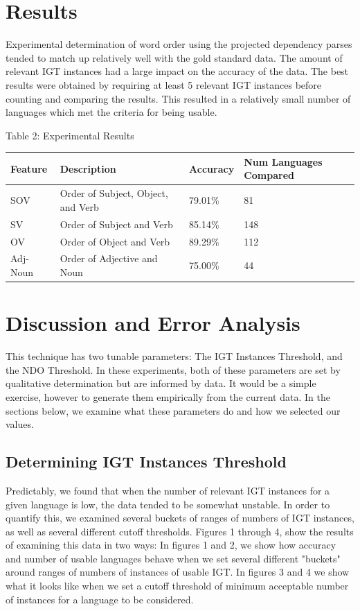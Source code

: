 \documentclass[]{article}
\begin{document}
\section{Results}
Experimental determination of word order using the projected dependency parses tended to match up relatively well with the gold standard data.  The amount of relevant IGT instances had a large impact on the accuracy of the data.  The best results were obtained by requiring at least 5 relevant IGT instances before counting and comparing the results.  This resulted in a relatively small number of languages which met the criteria for being usable.

\begin{center}
Table 2: Experimental Results
\end{center}
\begin{flushleft}
\begin{tabularx}{\textwidth}{|l|X|l|l|}
\hline
  \textbf{Feature} & \textbf{Description} & \textbf{Accuracy} & \textbf{Num Languages Compared} \\
\hline
SOV      & Order of Subject, Object, and Verb & 79.01\% & 81\\
\hline
SV       & Order of Subject and Verb          & 85.14\% & 148\\
\hline
OV       & Order of Object and Verb           & 89.29\% & 112\\
\hline
Adj-Noun & Order of Adjective and Noun        & 75.00\% & 44\\
\hline
\end{tabularx}
\end{flushleft}
\vspace{0.6cm}


\section{Discussion and Error Analysis}
This technique has two tunable parameters: The IGT Instances Threshold, and the NDO Threshold.  In these experiments, both of these parameters are set by qualitative determination but are informed by data.  It would be a simple exercise, however to generate them empirically from the current data.  In the sections below, we examine what these parameters do and how we selected our values.

\subsection{Determining IGT Instances Threshold}
Predictably, we found that when the number of relevant IGT instances for a given language is low, the data tended to be somewhat unstable.  In order to quantify this, we examined several buckets of ranges of numbers of IGT instances, as well as several different cutoff thresholds.   Figures 1 through 4, show the results of examining this data in two ways: In figures 1 and 2, we show how accuracy and number of usable languages behave when we set several different "buckets" around ranges of numbers of instances of usable IGT.  In figures 3 and 4  we show what it looks like when we set a cutoff threshold of minimum acceptable number of instances for a language to be considered.
\end{document}
